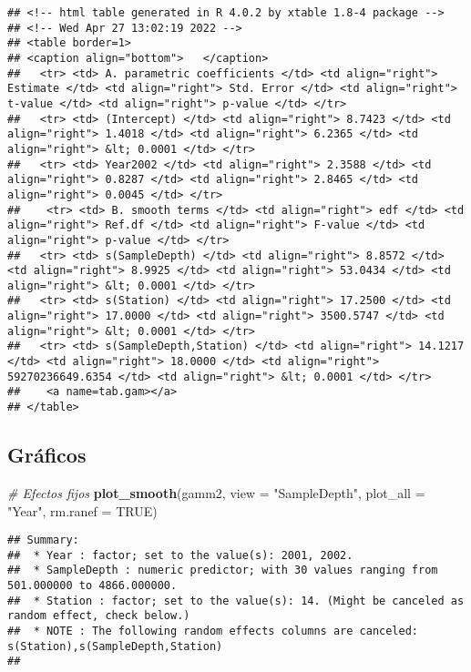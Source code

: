 \documentclass[
]{book}
\newenvironment{Shaded}{\begin{snugshade}}{\end{snugshade}}
\newcommand{\CommentTok}[1]{\textcolor[rgb]{0.56,0.35,0.01}{\textit{#1}}}
\newcommand{\DataTypeTok}[1]{\textcolor[rgb]{0.13,0.29,0.53}{#1}}
\newcommand{\KeywordTok}[1]{\textcolor[rgb]{0.13,0.29,0.53}{\textbf{#1}}}
\newcommand{\NormalTok}[1]{#1}
\newcommand{\OtherTok}[1]{\textcolor[rgb]{0.56,0.35,0.01}{#1}}
\newcommand{\StringTok}[1]{\textcolor[rgb]{0.31,0.60,0.02}{#1}}
\begin{document}
\begin{verbatim}
## <!-- html table generated in R 4.0.2 by xtable 1.8-4 package -->
## <!-- Wed Apr 27 13:02:19 2022 -->
## <table border=1>
## <caption align="bottom">   </caption>
##   <tr> <td> A. parametric coefficients </td> <td align="right"> Estimate </td> <td align="right"> Std. Error </td> <td align="right"> t-value </td> <td align="right"> p-value </td> </tr>
##   <tr> <td> (Intercept) </td> <td align="right"> 8.7423 </td> <td align="right"> 1.4018 </td> <td align="right"> 6.2365 </td> <td align="right"> &lt; 0.0001 </td> </tr>
##   <tr> <td> Year2002 </td> <td align="right"> 2.3588 </td> <td align="right"> 0.8287 </td> <td align="right"> 2.8465 </td> <td align="right"> 0.0045 </td> </tr>
##    <tr> <td> B. smooth terms </td> <td align="right"> edf </td> <td align="right"> Ref.df </td> <td align="right"> F-value </td> <td align="right"> p-value </td> </tr>
##   <tr> <td> s(SampleDepth) </td> <td align="right"> 8.8572 </td> <td align="right"> 8.9925 </td> <td align="right"> 53.0434 </td> <td align="right"> &lt; 0.0001 </td> </tr>
##   <tr> <td> s(Station) </td> <td align="right"> 17.2500 </td> <td align="right"> 17.0000 </td> <td align="right"> 3500.5747 </td> <td align="right"> &lt; 0.0001 </td> </tr>
##   <tr> <td> s(SampleDepth,Station) </td> <td align="right"> 14.1217 </td> <td align="right"> 18.0000 </td> <td align="right"> 59270236649.6354 </td> <td align="right"> &lt; 0.0001 </td> </tr>
##    <a name=tab.gam></a>
## </table>
\end{verbatim}

\hypertarget{gruxe1ficos}{%
\subsection{Gráficos}\label{gruxe1ficos}}

\begin{Shaded}
\begin{Highlighting}[]
\CommentTok{# Efectos fijos}
\KeywordTok{plot_smooth}\NormalTok{(gamm2, }\DataTypeTok{view =} \StringTok{"SampleDepth"}\NormalTok{, }\DataTypeTok{plot_all =} \StringTok{"Year"}\NormalTok{, }\DataTypeTok{rm.ranef =} \OtherTok{TRUE}\NormalTok{)}
\end{Highlighting}
\end{Shaded}

\begin{verbatim}
## Summary:
##  * Year : factor; set to the value(s): 2001, 2002. 
##  * SampleDepth : numeric predictor; with 30 values ranging from 501.000000 to 4866.000000. 
##  * Station : factor; set to the value(s): 14. (Might be canceled as random effect, check below.) 
##  * NOTE : The following random effects columns are canceled: s(Station),s(SampleDepth,Station)
## 
\end{verbatim}
\end{document}

